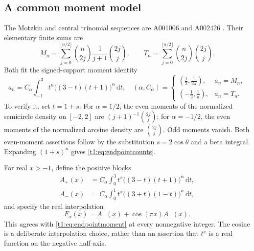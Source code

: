 \documentclass[11pt,openany]{book}
\numberwithin{equation}{chapter}
\theoremstyle{plain}
\theoremstyle{definition}
\theoremstyle{remark}
\newcommand{\ddn}{\mathrm d}                  %
\begin{document}
\subsection{A common moment model}
The Motzkin and central trinomial sequences are A001006 and A002426 \cite{oeismotzkin,oeistrinomial}. Their elementary finite sums are
\begin{equation}
 M_n=\sum_{j=0}^{\lfloor n/2\rfloor}\binom n{2j}\frac1{j+1}\binom{2j}j,
 \qquad
 T_n=\sum_{j=0}^{\lfloor n/2\rfloor}\binom n{2j}\binom{2j}j.
 \label{t1:eq:endpointcounts}
\end{equation}
Both fit the signed-support moment identity
\begin{equation}
 a_n=C_\alpha\int_{-1}^3 t^n\bigl((3-t)(t+1)\bigr)^\alpha\,\ddn t,
 \quad
 (\alpha,C_\alpha)=
 \begin{cases}
 (\tfrac12,\tfrac1{2\pi}),&a_n=M_n,\\
 (-\tfrac12,\tfrac1\pi),&a_n=T_n.
 \end{cases}
 \label{t1:eq:endpointmoment}
\end{equation}
To verify it, set $t=1+s$. For $\alpha=1/2$, the even moments of the normalized semicircle density on $[-2,2]$ are $(j+1)^{-1}\binom{2j}j$; for $\alpha=-1/2$, the even moments of the normalized arcsine density are $\binom{2j}j$. Odd moments vanish. Both even-moment assertions follow by the substitution $s=2\cos\theta$ and a beta integral. Expanding $(1+s)^n$ gives \eqref{t1:eq:endpointcounts}.

For real $x>-1$, define the positive blocks
\begin{align}
 A_+(x)&=C_\alpha\int_0^3t^x\bigl((3-t)(t+1)\bigr)^\alpha\,\ddn t,\nonumber\\
 A_-(x)&=C_\alpha\int_0^1t^x\bigl((3+t)(1-t)\bigr)^\alpha\,\ddn t,
 \label{t1:eq:endpointblocks}
\end{align}
and specify the real interpolation
\begin{equation}
 F_\alpha(x)=A_+(x)+\cos(\pi x)A_-(x).
 \label{t1:eq:endpointinterp}
\end{equation}
This agrees with \eqref{t1:eq:endpointmoment} at every nonnegative integer. The cosine is a deliberate interpolation choice, rather than an assertion that $t^x$ is a real function on the negative half-axis.
\end{document}
